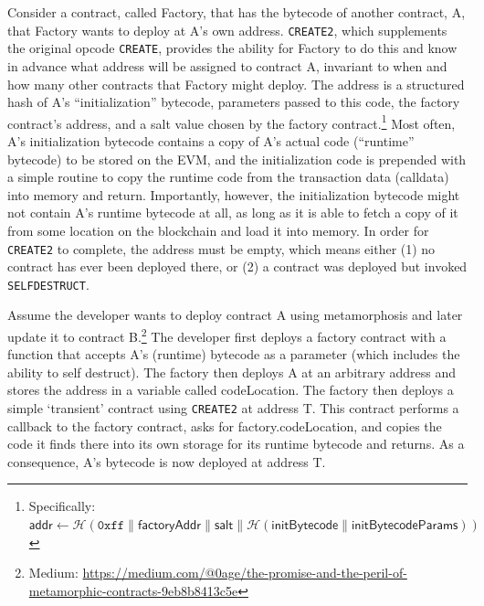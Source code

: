 Consider a contract, called Factory, that has the bytecode of another contract, A, that Factory wants to deploy at A's own address. \texttt{CREATE2}, which supplements the original opcode \texttt{CREATE}, provides the ability for Factory to do this and know in advance what address will be assigned to contract A, invariant to when and how many other contracts that Factory might deploy.  The address is a structured hash of A's ``initialization'' bytecode, parameters passed to this code, the factory contract's address, and a salt value chosen by the factory contract.\footnote{Specifically: $\mathsf{addr} \leftarrow \mathcal{H}(\mathtt{0xff} \| \mathsf{factoryAddr} \| \mathsf{salt} \| \mathcal{H} (\mathsf{initBytecode} \| \mathsf{initBytecodeParams}))$} Most often, A's initialization bytecode contains a copy of A's actual code (``runtime'' bytecode) to be stored on the EVM, and the initialization code is prepended with a simple routine to copy the runtime code from the transaction data (calldata) into memory and return. Importantly, however, the initialization bytecode might not contain A's runtime bytecode at all, as long as it is able to fetch a copy of it from some location on the blockchain and load it into memory. In order for \texttt{CREATE2} to complete, the address must be empty, which means either (1) no contract has ever been deployed there, or (2) a contract was deployed but invoked \texttt{SELFDESTRUCT}.



Assume the developer wants to deploy contract A using metamorphosis and later update it to contract B.\footnote{Medium: \url{https://medium.com/@0age/the-promise-and-the-peril-of-metamorphic-contracts-9eb8b8413c5e}} The developer first deploys a factory contract with a function that accepts A's (runtime) bytecode as a parameter (which includes the ability to self destruct). The factory then deploys A at an arbitrary address and stores the address in a variable called codeLocation. The factory then deploys a simple `transient' contract using \texttt{CREATE2} at address T. This contract performs a callback to the factory contract, asks for factory.codeLocation, and copies the code it finds there into its own storage for its runtime bytecode and returns. As a consequence, A's bytecode is now deployed at address T. 

